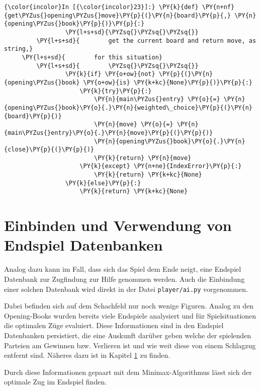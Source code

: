 \begin{Verbatim}[commandchars=\\\{\}]
{\color{incolor}In [{\color{incolor}23}]:} \PY{k}{def} \PY{n+nf}{get\PYZus{}opening\PYZus{}move}\PY{p}{(}\PY{n}{board}\PY{p}{,} \PY{n}{opening\PYZus{}book}\PY{p}{)}\PY{p}{:}
                 \PY{l+s+sd}{\PYZsq{}\PYZsq{}\PYZsq{}}
         \PY{l+s+sd}{        get the current board and return move, as string,}
	 \PY{l+s+sd}{        for this situation}
         \PY{l+s+sd}{        \PYZsq{}\PYZsq{}\PYZsq{}}
                 \PY{k}{if} \PY{o+ow}{not} \PY{p}{(}\PY{n}{opening\PYZus{}book} \PY{o+ow}{is} \PY{k+kc}{None}\PY{p}{)}\PY{p}{:}
                     \PY{k}{try}\PY{p}{:}
                         \PY{n}{main\PYZus{}entry} \PY{o}{=} \PY{n}{opening\PYZus{}book}\PY{o}{.}\PY{n}{weighted\_choice}\PY{p}{(}\PY{n}{board}\PY{p}{)}
                         \PY{n}{move} \PY{o}{=} \PY{n}{main\PYZus{}entry}\PY{o}{.}\PY{n}{move}\PY{p}{(}\PY{p}{)}
                         \PY{n}{opening\PYZus{}book}\PY{o}{.}\PY{n}{close}\PY{p}{(}\PY{p}{)}
                         \PY{k}{return} \PY{n}{move}
                     \PY{k}{except} \PY{n+ne}{IndexError}\PY{p}{:}
                         \PY{k}{return} \PY{k+kc}{None}
                 \PY{k}{else}\PY{p}{:}
                     \PY{k}{return} \PY{k+kc}{None}
\end{Verbatim}

    \section{Einbinden und Verwendung von Endspiel
Datenbanken}\label{einbinden-und-verwendung-von-endspiel-datenbanken}

Analog dazu kann im Fall, dass sich das Spiel dem Ende neigt, eine
Endspiel Datenbank zur Zugfindung zur Hilfe genommen werden. Auch die
Einbindung einer solchen Datenbank wird direkt in der Datei
\texttt{player/ai.py} vorgenommen.

Dabei befinden sich auf dem Schachfeld nur noch wenige Figuren. Analog
zu den Opening-Books wurden bereits viele Endspiele analysiert und für
Spielsituationen die optimalen Züge evaluiert. Diese Informationen sind
in den Endspiel Datenbanken persistiert, die eine Auskunft darüber
geben welche der spielenden Parteien am Gewinnen bzw. Verlieren ist und
wie weit diese von einem Schlagzug entfernt sind. Näheres dazu ist in
Kapitel \ref{einbinden-und-verwendung-von-endspiel-datenbanken} zu finden.

Durch diese Informationen gepaart mit dem Minimax-Algorithmus lässt sich
der optimale Zug im Endspiel finden.


